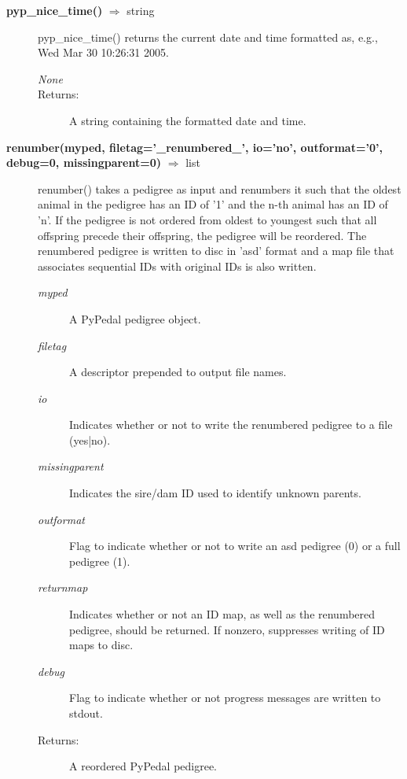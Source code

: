 \begin{description}
\item[\textbf{pyp\_nice\_time()} $\Rightarrow$ string]
pyp\_nice\_time() returns the current date and time formatted as, e.g., Wed Mar 30 10:26:31 2005.
\begin{description}
\item[\emph{None}]
\item[Returns:] A string containing the formatted date and time.
\end{description}

\item[\textbf{renumber(myped, filetag='\_renumbered\_', io='no', outformat='0', debug=0, missingparent=0)} $\Rightarrow$ list]
renumber() takes a pedigree as input and renumbers it such that the oldest animal in the pedigree has an ID of '1' and the n-th animal has an ID of 'n'. If the pedigree is not ordered from oldest to youngest such that all offspring precede their offspring, the pedigree will be reordered. The renumbered pedigree is written to disc in 'asd' format and a map file that associates sequential IDs with original IDs is also written.
\begin{description}
\item[\emph{myped}] A PyPedal pedigree object.
\item[\emph{filetag}] A descriptor prepended to output file names.
\item[\emph{io}] Indicates whether or not to write the renumbered pedigree to a file (yes|no).
\item[\emph{missingparent}] Indicates the sire/dam ID used to identify unknown parents.
\item[\emph{outformat}] Flag to indicate whether or not to write an asd pedigree (0) or a full pedigree (1).
\item[\emph{returnmap}] Indicates whether or not an ID map, as well as the renumbered pedigree, should be returned.  If nonzero, suppresses writing of ID maps to disc.
\item[\emph{debug}] Flag to indicate whether or not progress messages are written to stdout.
\item[Returns:] A reordered PyPedal pedigree.
\end{description}


\end{description}

